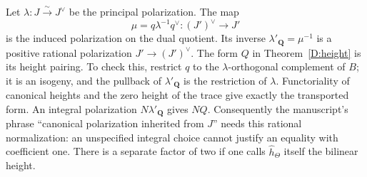 \begin{remark}
\label{D:quotient-polarization}
Let $\lambda:J\xrightarrow{\sim}J^\vee$ be the principal polarization.
The map
\[
       \mu=q\lambda^{-1}q^\vee:(J')^\vee\longrightarrow J'
\]
is the induced polarization on the dual quotient.  Its inverse
$\lambda'_{\mathbf Q}=\mu^{-1}$ is a positive rational polarization
$J'\to(J')^\vee$.  The form $Q$ in Theorem~\ref{D:height} is its height
pairing.  To check this, restrict $q$ to the $\lambda$-orthogonal
complement of $B$; it is an isogeny, and the pullback of
$\lambda'_{\mathbf Q}$ is the restriction of $\lambda$.  Functoriality
of canonical heights and the zero height of the trace give exactly the
transported form.  An integral polarization $N\lambda'_{\mathbf Q}$
gives $NQ$.  Consequently the manuscript's phrase ``canonical
polarization inherited from $J$'' needs this rational normalization:
an unspecified integral choice cannot justify an equality with coefficient
one.  There is a separate factor of two if one calls
$\widehat h_\Theta$ itself the bilinear height.
\end{remark}

